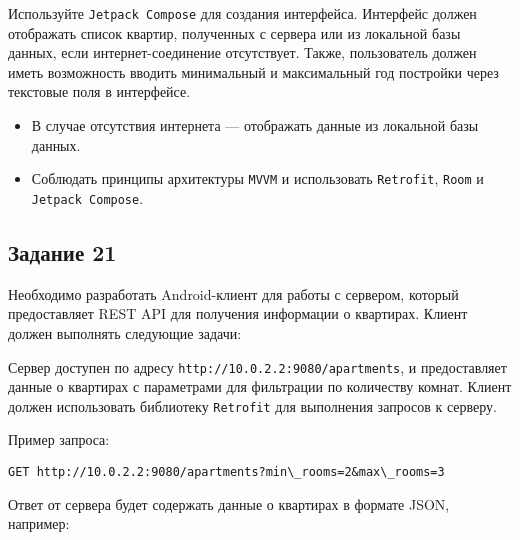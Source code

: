 \documentclass[a4paper,12pt]{article}
\begin{document}
Используйте \texttt{Jetpack Compose} для создания интерфейса. Интерфейс должен отображать список квартир, полученных с сервера или из локальной базы данных, если интернет-соединение отсутствует. Также, пользователь должен иметь возможность вводить минимальный и максимальный год постройки через текстовые поля в интерфейсе.

\begin{itemize}
  \item В случае отсутствия интернета — отображать данные из локальной базы данных.
  \item Соблюдать принципы архитектуры \texttt{MVVM} и использовать \texttt{Retrofit}, \texttt{Room} и \texttt{Jetpack Compose}.
\end{itemize}

\subsection*{Задание 21}

Необходимо разработать Android-клиент для работы с сервером, который предоставляет REST API для получения информации о квартирах. Клиент должен выполнять следующие задачи:

Сервер доступен по адресу \texttt{http://10.0.2.2:9080/apartments}, и предоставляет данные о квартирах с параметрами для фильтрации по количеству комнат. Клиент должен использовать библиотеку \texttt{Retrofit} для выполнения запросов к серверу.

Пример запроса:
\begin{verbatim}
GET http://10.0.2.2:9080/apartments?min\_rooms=2&max\_rooms=3
\end{verbatim}

Ответ от сервера будет содержать данные о квартирах в формате JSON, например:
\end{document}
